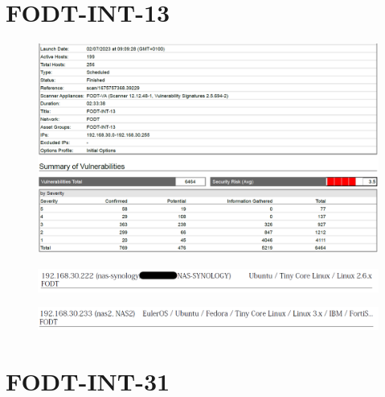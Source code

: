 \documentclass[target=bach,aauheader=]{thud}
\begin{document}
\pagebreak

\section{FODT-INT-13}

\begin{figure}[h]
    \centering
    \includegraphics[width=1\linewidth]{images/FODT-INT-13_1.png}
    \caption{}
    \label{fig:fodt-int-13_1}
\end{figure}

\begin{figure}[h]
    \centering
    \includegraphics[width=1\linewidth]{images/FODT-INT-13_2.png}
    \caption{}
    \label{fig:fodt-int-13_2}
\end{figure}

\begin{figure}[h]
    \centering
    \includegraphics[width=1\linewidth]{images/FODT-INT-13_3.png}
    \caption{}
    \label{fig:fodt-int-13_3}
\end{figure}

\pagebreak

\section{FODT-INT-31}
\end{document}

